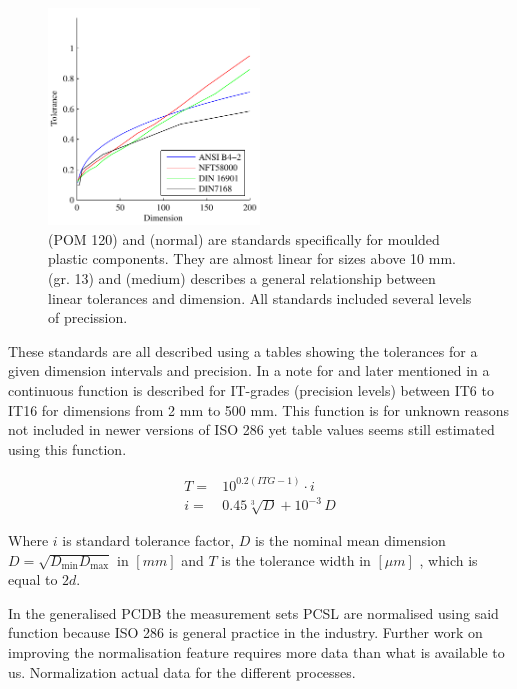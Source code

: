 \documentclass[aip,amsmath, preprint, author-year]{revtex4-1}
\begin{document}
\begin{figure}
\includegraphics[width=0.5\textwidth]{Tolerance_standards.pdf}
\caption{\label{fig:tolstd} \citeauthor{DIN16901} (POM 120) and \citeauthor{NFT58000} (normal) are standards specifically for moulded plastic components. They are almost linear for sizes above 10 mm. 
\citeauthor{american1978preferred} (gr. 13) and \citeauthor{DIN7168} (medium) describes a general relationship between linear tolerances and dimension. All standards included several levels of precission.}
\end{figure}

These standards are all described using a tables showing the tolerances for a given dimension intervals and precision. 
In a note for \citeauthor{american1978preferred} and later mentioned in \citeauthor{ISO286} a continuous function is described for IT-grades (precision levels) between IT6 to IT16 for dimensions from 2 mm to 500 mm. 
This function is for unknown reasons not included in newer versions of ISO 286 yet table values seems still estimated using this function.

\begin{align}
	T =& 10^{0.2 (ITG -1)} \cdot i \\
	i =& 0.45 \sqrt[3]{D} + 10^{-3} \, D 
\end{align}

Where $i$ is standard tolerance factor, $D$ is the nominal mean dimension $D = \sqrt{D_{\textrm{min}} D_\textrm{max}}$ in $[mm]$ and $T $ is the tolerance width in $[\mu m]$ , which is equal to $2d$. 

In the generalised PCDB the measurement sets PCSL are normalised using said function because ISO 286 is general practice in the industry. 
Further work on improving the normalisation feature requires more data than what is available to us. Normalization actual data for the different processes.
\end{document}
